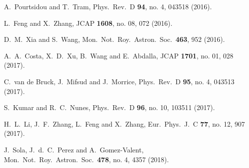 \documentclass[aps,prd,nofootinbib,amsmath,amssymb,twocolumn,superscriptaddress,10pt]{revtex4}%
\begin{document}
\begin{thebibliography}{}
  A.~Pourtsidou and T.~Tram,
  Phys.\ Rev.\ D {\bf 94}, no. 4, 043518 (2016).

  L.~Feng and X.~Zhang,
  JCAP {\bf 1608}, no. 08, 072 (2016).

  D.~M.~Xia and S.~Wang,
  Mon.\ Not.\ Roy.\ Astron.\ Soc.\  {\bf 463}, 952 (2016).

  A.~A.~Costa, X.~D.~Xu, B.~Wang and E.~Abdalla,
  JCAP {\bf 1701}, no. 01, 028 (2017).

  C.~van de Bruck, J.~Mifsud and J.~Morrice,
  Phys.\ Rev.\ D {\bf 95}, no. 4, 043513 (2017).


  S.~Kumar and R.~C.~Nunes,
  Phys.\ Rev.\ D {\bf 96}, no. 10, 103511 (2017).

  H.~L.~Li, J.~F.~Zhang, L.~Feng and X.~Zhang,
  Eur.\ Phys.\ J.\ C {\bf 77}, no. 12, 907 (2017).



  J.~Sola, J.~d.~C.~Perez and A.~Gomez-Valent,
  Mon.\ Not.\ Roy.\ Astron.\ Soc.\  {\bf 478}, no. 4, 4357 (2018).


\end{thebibliography}
\end{document}
